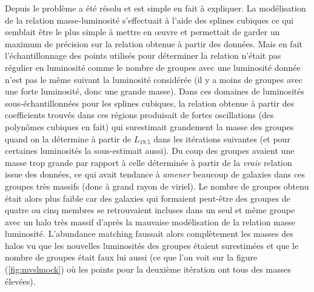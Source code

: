 Depuis le problème a été résolu et est simple en fait à expliquer. La modélisation de la relation masse-luminosité s'effectuait à
l'aide des splines cubiques ce qui semblait être le plus simple à mettre en {\oe}uvre et permettait de garder un maximum de
précision sur la relation obtenue à partir des données. Mais en fait l'échantillonnage des points utilisés pour déterminer la
relation n'était pas régulier en luminosité comme le nombre de groupes avec une luminosité donnée n'est pas le même suivant la
luminosité considérée (il y a moins de groupes avec une forte luminosité, donc une grande masse). Dans ces domaines de luminosités
sous-échantillonnées pour les splines cubiques, la relation obtenue à partir des coefficients trouvés dans ces régions produisait
de fortes oscillations (des polynômes cubiques en fait) qui surestimait grandement la masse des groupes quand on la détermine à
partir de $L_{19.5}$ dans les itérations suivantes (et pour certaines luminosités la sous-estimait aussi). Du coup des groupes
avaient une masse trop grande par rapport à celle déterminée à partir de la \emph{vraie} relation issue des données, ce qui avait
tendance à \emph{amener} beaucoup de galaxies dans ces groupes très massifs (donc à grand rayon de viriel). Le nombre de groupes
obtenu était alors plus faible car des galaxies qui formaient peut-être des groupes de quatre ou cinq membres se retrouvaient
incluses dans un seul et même groupe avec un halo très massif d'après la mauvaise modélisation de la relation masse luminosité.
L'abundance matching faussait alors complètement les masses des halos vu que les nouvelles luminosités des groupes étaient
surestimées et que le nombre de groupes était faux lui aussi (ce que l'on voit sur la figure (\ref{fig:mvslmock}) où les points
pour la deuxième itération ont tous des masses élevées).


